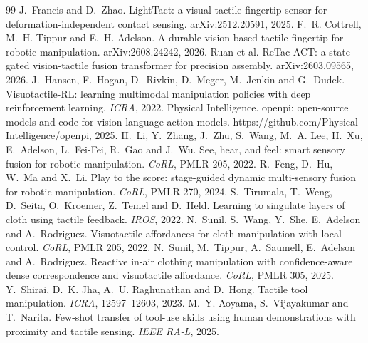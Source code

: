 \begin{thebibliography}{99}
J.~Francis and D.~Zhao. LightTact: a visual-tactile fingertip sensor for
deformation-independent contact sensing. arXiv:2512.20591, 2025.
 F.~R. Cottrell, M.~H. Tippur and E.~H. Adelson. A
durable vision-based tactile fingertip for robotic manipulation.
arXiv:2608.24242, 2026.
 Ruan et al. ReTac-ACT: a state-gated vision-tactile
fusion transformer for precision assembly. arXiv:2603.09565, 2026.
 J.~Hansen, F.~Hogan, D.~Rivkin, D.~Meger, M.~Jenkin
and G.~Dudek. Visuotactile-RL: learning multimodal manipulation policies with
deep reinforcement learning. \emph{ICRA}, 2022.
 Physical Intelligence. openpi: open-source models and code for
vision-language-action models. https://github.com/Physical-Intelligence/openpi,
2025.
 H.~Li, Y.~Zhang, J.~Zhu, S.~Wang, M.~A. Lee, H.~Xu,
E.~Adelson, L.~Fei-Fei, R.~Gao and J.~Wu. See, hear, and feel: smart sensory fusion
for robotic manipulation. \emph{CoRL}, PMLR 205, 2022.
 R.~Feng, D.~Hu, W.~Ma and X.~Li. Play to the score:
stage-guided dynamic multi-sensory fusion for robotic manipulation. \emph{CoRL},
PMLR 270, 2024.
 S.~Tirumala, T.~Weng, D.~Seita, O.~Kroemer, Z.~Temel
and D.~Held. Learning to singulate layers of cloth using tactile feedback.
\emph{IROS}, 2022.
 N.~Sunil, S.~Wang, Y.~She, E.~Adelson and A.~Rodriguez.
Visuotactile affordances for cloth manipulation with local control. \emph{CoRL},
PMLR 205, 2022.
 N.~Sunil, M.~Tippur, A.~Saumell, E.~Adelson and
A.~Rodriguez. Reactive in-air clothing manipulation with confidence-aware dense
correspondence and visuotactile affordance. \emph{CoRL}, PMLR 305, 2025.
 Y.~Shirai, D.~K. Jha, A.~U. Raghunathan and D.~Hong.
Tactile tool manipulation. \emph{ICRA}, 12597--12603, 2023.
 M.~Y. Aoyama, S.~Vijayakumar and T.~Narita. Few-shot
transfer of tool-use skills using human demonstrations with proximity and tactile
sensing. \emph{IEEE RA-L}, 2025.
\end{thebibliography}
